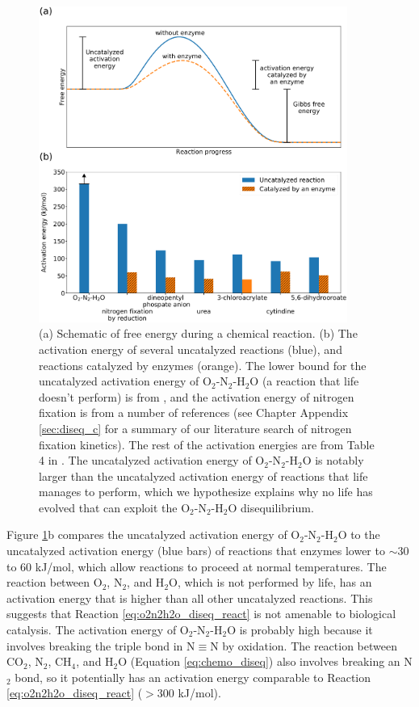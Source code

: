 \begin{figure}
  \centering
  \includegraphics[width=0.9\textwidth]{tex/2diseq/Figure4.pdf}
  \caption{(a) Schematic of free energy during a chemical reaction. (b) The activation energy of several uncatalyzed reactions (blue), and reactions catalyzed by enzymes (orange). The lower bound for the uncatalyzed activation energy of O$_2$-N$_2$-H$_2$O (a reaction that life doesn't perform) is from \citet{Dixon_1984}, and the activation energy of nitrogen fixation is from a number of references \citep{Andersen_1977,Hageman_1980} (see Chapter Appendix \ref{sec:diseq_c} for a summary of our literature search of nitrogen fixation kinetics). The rest of the activation energies are from Table 4 in \citet{Wolfenden_2006}. The uncatalyzed activation energy of O$_2$-N$_2$-H$_2$O is notably larger than the uncatalyzed activation energy of reactions that life manages to perform, which we hypothesize explains why no life has evolved that can exploit the O$_2$-N$_2$-H$_2$O disequilibrium.}
  \label{fig:diseq_figure4}
\end{figure}

Figure \ref{fig:diseq_figure4}b compares the uncatalyzed activation energy of O$_2$-N$_2$-H$_2$O to the uncatalyzed activation energy (blue bars) of reactions that enzymes lower to $\sim 30$ to 60 kJ/mol, which allow reactions to proceed at normal temperatures. The reaction between O$_2$, N$_2$, and H$_2$O, which is not performed by life, has an activation energy that is higher than all other uncatalyzed reactions. This suggests that Reaction \eqref{eq:o2n2h2o_diseq_react} is not amenable to biological catalysis. The activation energy of O$_2$-N$_2$-H$_2$O is probably high because it involves breaking the triple bond in $\mathrm{N \equiv N}$ by oxidation. The reaction between CO$_2$, N$_2$, CH$_4$, and H$_2$O (Equation \eqref{eq:chemo_diseq}) also involves breaking an N$_2$ bond, so it potentially has an activation energy comparable to Reaction \eqref{eq:o2n2h2o_diseq_react} ($> 300$ kJ/mol).

